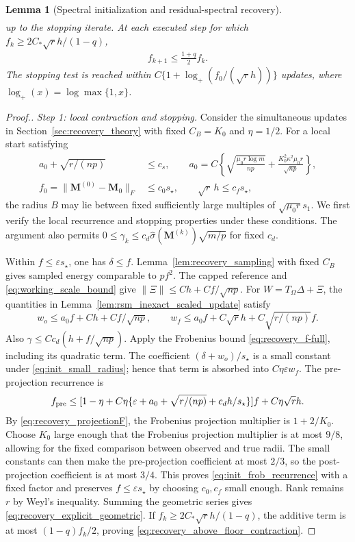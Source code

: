 \documentclass[numsec,webpdf,modern,large,namedate]{oup-authoring-template}
\theoremstyle{plain}
\newtheorem{slemma}{Lemma}%
\theoremstyle{remark}
\newcommand{\M}{\bm{M}}
\newif\ifmarkchanges
\newenvironment{revision}{\begingroup\ifmarkchanges\color{red}\fi}{\endgroup}
\begin{document}
\begin{revision}
\begin{slemma}[Spectral initialization and residual-spectral recovery]
\begin{align}
\end{align}
up to the stopping iterate. At each executed step for which
$f_k\ge2C_*\sqrt r h/(1-q)$,
\begin{align}
 f_{k+1}\le\frac{1+q}{2}f_k.
 \label{eq:recovery_above_floor_contraction}
\end{align}
The stopping test is reached within
$C\{1+\log_+(f_0/(\sqrt r h))\}$ updates, where
$\log_+(x)=\log\max\{1,x\}$.
\end{slemma}
\begin{proof}[Proof.]
\textit{Step 1: local contraction and stopping.} Consider the simultaneous updates in Section~\ref{sec:recovery_theory}
with fixed $C_B=K_0$ and $\eta=1/2$. For a local start satisfying
\begin{align}
 a_0+\sqrt{r/(np)}&\le c_s,\qquad
 a_0=C\left\{\sqrt{\frac{\mu_0r\log m}{np}}+
                   \frac{K_0^2\kappa^2\mu_0r}{\sqrt{np}}\right\},
 \label{eq:init_frob_sampling}\\
 f_0=\|\M^{(0)}-\M_0\|_F&\le c_0s_\star,
 \qquad \sqrt r\,h\le c_fs_\star,
 \label{eq:init_small_radius}
\end{align}
the radius $B$ may lie between fixed sufficiently large multiples
of $\sqrt{\mu_0r}s_1$.  
We first verify the local recurrence and stopping properties under these conditions.
The argument also permits
$0\le\gamma_k\le c_d\widehat\sigma(\M^{(k)})\sqrt{m/p}$ for fixed $c_d$.

Within $f\le\varepsilon s_\star$, one has $\delta\le f$.
Lemma~\ref{lem:recovery_sampling} with fixed $C_B$ gives sampled energy
comparable to $pf^2$.  The capped reference and \eqref{eq:working_scale_bound} give
$\|\Xi\|\le Ch+Cf/\sqrt{np}$.
For $W=T_\Omega\Delta+\Xi$, the quantities in
Lemma~\ref{lem:rsm_inexact_scaled_update} satisfy
\[
 w_o\le a_0f+Ch+Cf/\sqrt{np},\qquad
 w_f\le a_0f+C\sqrt r h+C\sqrt{r/(np)}f.
\]
Also $\gamma\le Cc_d(h+f/\sqrt{np})$.
Apply the Frobenius bound \eqref{eq:recovery_f-full}, including its
quadratic term.  The coefficient $(\delta+w_o)/s_\star$ is a small
constant under \eqref{eq:init_small_radius}; hence that term is absorbed
into $C\eta\varepsilon w_f$.  The pre-projection recurrence is
\[
 f_{\rm pre}\le[1-\eta+C\eta\{\varepsilon+a_0+
                 \sqrt{r/(np)}+c_dh/s_\star\}]f+C\eta\sqrt r h.
\]
By \eqref{eq:recovery_projectionF}, the Frobenius projection multiplier is $1+2/K_0$.  Choose $K_0$ large enough that the Frobenius projection multiplier is at
most $9/8$, allowing for the fixed comparison between observed and true
radii. The small constants can then make the pre-projection coefficient
at most $2/3$, so the post-projection coefficient is at most $3/4$.
This proves \eqref{eq:init_frob_recurrence} with a fixed factor and preserves
$f\le\varepsilon s_\star$ by choosing $c_0,c_f$ small enough.
Rank remains $r$ by Weyl's inequality. Summing the geometric series gives
\eqref{eq:recovery_explicit_geometric}. If
$f_k\ge2C_*\sqrt r h/(1-q)$, the additive term is at most
$(1-q)f_k/2$, proving \eqref{eq:recovery_above_floor_contraction}.



\end{proof}
\end{revision}
\end{document}
